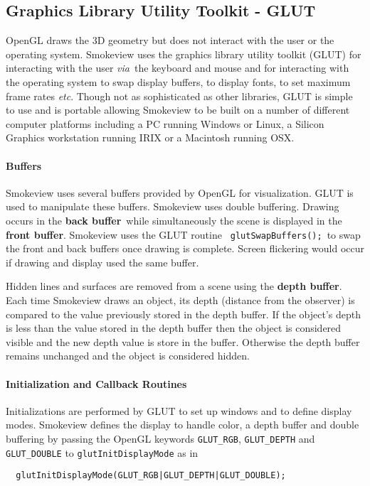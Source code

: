 \subsection{Graphics Library Utility Toolkit - GLUT}
OpenGL draws the 3D geometry but does not interact with the user
or the operating system. Smokeview uses the graphics library
utility toolkit (GLUT) for interacting with the user {\em via}\
the keyboard and mouse and for interacting with the operating
system to swap display buffers, to display fonts, to set maximum
frame rates {\em etc}. Though not as sophisticated as other
libraries, GLUT is simple to use and is portable allowing
Smokeview to be built on a number of different computer platforms
including a PC running Windows or Linux, a Silicon Graphics
workstation running IRIX or a Macintosh running OSX.

\paragraph{Buffers} Smokeview uses several buffers provided by
OpenGL for visualization.  GLUT is used to manipulate these
buffers. Smokeview uses double buffering.  Drawing occurs in the
{\bf back buffer}\ while simultaneously the scene is displayed in
the {\bf front buffer}. Smokeview uses the GLUT routine {\tt
glutSwapBuffers();}\ to swap the front and back buffers once
drawing is complete. Screen flickering would occur if drawing and
display used the same buffer.

Hidden lines and surfaces are removed from a scene using the {\bf
depth buffer}.  Each time Smokeview draws an object, its depth
(distance from the observer) is compared to the value previously
stored in the depth buffer.  If the object's depth is less than
the value stored in the depth buffer then the object is considered
visible and the new depth value is store in the buffer. Otherwise
the depth buffer remains unchanged and the object is considered
hidden.

\paragraph{Initialization and Callback Routines}
Initializations are performed by GLUT to set up windows and to
define display modes.  Smokeview defines the display to handle
color, a depth buffer and double buffering by passing the OpenGL
keywords {\tt GLUT\_RGB}, {\tt GLUT\_DEPTH} and {\tt GLUT\_DOUBLE}
to {\tt glutInitDisplayMode} as in

\begin{verbatim}
  glutInitDisplayMode(GLUT_RGB|GLUT_DEPTH|GLUT_DOUBLE);
\end{verbatim}

